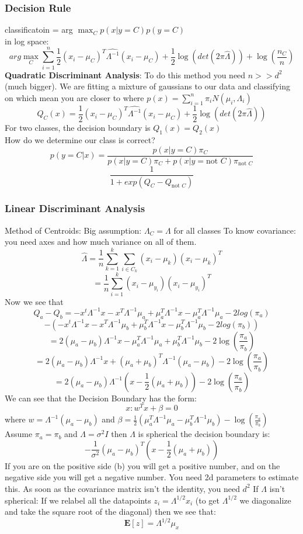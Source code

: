 \documentclass{article}
\begin{document}
\subsubsection{Decision Rule}
classificatoin = arg $\max_C p(x|y=C) p(y=C)$ \\
in log space: 
$$ arg \max_C \sum_{i=1}^n \frac{1}{2} (x_i-\mu_C)^T \hat{\Lambda^{-1}} (x_i - \mu_C) + \frac{1}{2}\log(det(2\pi \hat{\Lambda})) + \log(\frac{n_C}{n})$$
\textbf{Quadratic Discriminant Analysis}:
To do this method you need $n>>d^2$ (much bigger). We are fitting a mixture of gaussians to our data and classifying on which mean you are closer to where $p(x) = \sum_{i=1}^n \pi_i N(\mu_i,\Lambda_i)$  
$$Q_C(x) = \frac{1}{2} (x_i-\mu_C)^T \hat{\Lambda^{-1}} (x_i - \mu_C) + \frac{1}{2}\log(det(2\pi \hat{\Lambda}))$$
For two classes, the decision boundary is $Q_1(x) = Q_2(x)$ \\
How do we determine our class is correct?
$$p(y=C|x) = \frac{p(x|y=C)\pi_C}{p(x|y=C)\pi_C + p(x|y=\textrm{not }C)\pi_{\textrm{not }C}}$$
$$\frac{1}{1 + exp(Q_C - Q_{\textrm{not }C})}$$

\subsubsection{Linear Discriminant Analysis}
Method of Centroids: Big assumption: $\Lambda_C = \Lambda$ for all classes
To know covariance: you need axes and how much variance on all of them.
$$\hat{\Lambda} = \frac{1}{n} \sum_{k=1}^k \sum_{i \in C_k} (x_i - \mu_k)(x_i-\mu_k)^T $$
$$=\frac{1}{n} \sum_{i=1}^k (x_i - \mu_{y_i})(x_i-\mu_{y_i})^T$$
Now we see that 
$$Q_a - Q_b = -x^t \Lambda^{-1} x - x^T\Lambda^{-1}\mu_a + \mu_a^T\Lambda^{-1} x - \mu_a^T \Lambda^{-1} \mu_a - 2log(\pi_a)$$ $$ - (-x^t \Lambda^{-1} x - x^T\Lambda^{-1}\mu_b + \mu_b^T\Lambda^{-1} x - \mu_b^T \Lambda^{-1} \mu_b - 2log(\pi_b))$$
$$=2(\mu_a - \mu_b)\Lambda^{-1}x - \mu_a^T \Lambda^{-1} \mu_a +\mu_b^T \Lambda^{-1} \mu_b -2\log(\frac{\pi_a}{\pi_b})$$
$$=2(\mu_a - \mu_b)\Lambda^{-1}x + (\mu_a + \mu_b)^T \Lambda^{-1} (\mu_a -\mu_b) -2\log(\frac{\pi_a}{\pi_b})$$
$$=2(\mu_a - \mu_b)\Lambda^{-1}(x - \frac{1}{2}(\mu_a + \mu_b)) -2\log(\frac{\pi_a}{\pi_b})$$
We can see that the Decision Boundary has the form:
$$x: w^Tx + \beta = 0$$ where $w = \Lambda^{-1}(\mu_a - \mu_b)$ and $\beta = \frac{1}{2}(\mu_a^T \Lambda^{-1} \mu_a - \mu_b^T \Lambda^{-1} \mu_b) - \log(\frac{\pi_a}{\pi_b})$ \\
Assume $\pi_a = \pi_b$ and $\Lambda = \sigma^2 I$ then $\Lambda$ is spherical the decision boundary is:
$$ - \frac{1}{\sigma^2} (\mu_a - \mu_b)^T(x - \frac{1}{2}(\mu_a + \mu_b))$$
If you are on the positive side (b) you will get a positive number, and on the negative side you will get a negative number. You need 2d parameters to estimate this. As soon as the covariance matrix isn't the identity, you need $d^2$
If $\Lambda$ isn't spherical: If we relabel all the datapoints $z_i = \Lambda^{1/2} x_i$ (to get $\Lambda^{1/2}$ we diagonalize and take the square root of the diagonal) then we see that:
$$\mathbf{E}[z] = \Lambda^{1/2} \mu_x$$
\end{document}
